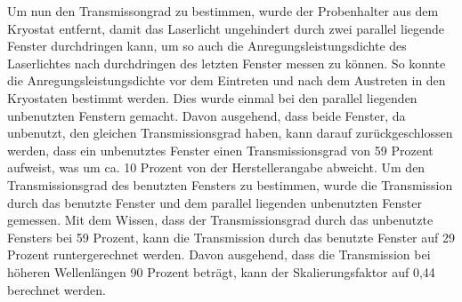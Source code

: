 Um nun den Transmissongrad zu bestimmen, wurde der Probenhalter aus dem Kryostat entfernt, damit das Laserlicht ungehindert durch zwei parallel liegende Fenster durchdringen kann, um so auch die Anregungsleistungsdichte des Laserlichtes nach durchdringen des letzten Fenster messen zu können. So konnte die Anregungsleistungsdichte vor dem Eintreten und nach dem Austreten in den Kryostaten bestimmt werden. 
Dies wurde einmal bei den parallel liegenden unbenutzten Fenstern gemacht. Davon ausgehend, dass beide Fenster, da unbenutzt, den gleichen Transmissionsgrad haben, kann darauf zurückgeschlossen werden, dass ein unbenutztes Fenster einen Transmissionsgrad von 59 Prozent aufweist, was um ca. 10 Prozent von der Herstellerangabe abweicht. 
Um den Transmissionsgrad des benutzten Fensters zu bestimmen, wurde die Transmission durch das benutzte Fenster und dem parallel liegenden unbenutzten Fenster gemessen. Mit dem Wissen, dass der Transmissionsgrad durch das unbenutzte Fensters bei 59 Prozent, kann die Transmission durch das benutzte Fenster auf 29 Prozent runtergerechnet werden. 
Davon ausgehend, dass die Transmission bei höheren Wellenlängen 90 Prozent beträgt, kann der Skalierungsfaktor auf 0,44 berechnet werden. 
